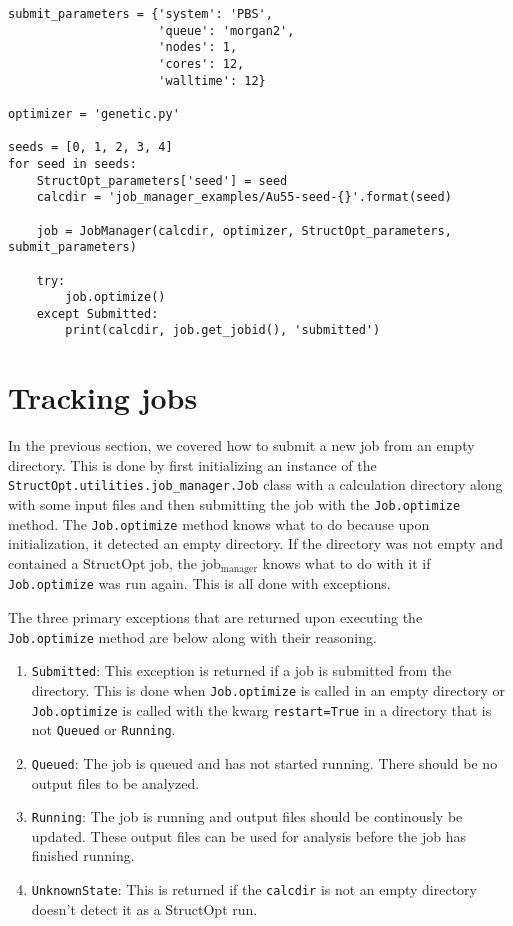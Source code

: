 \documentclass[11pt]{article}
\begin{document}
\begin{verbatim}
submit_parameters = {'system': 'PBS',
                     'queue': 'morgan2',
                     'nodes': 1,
                     'cores': 12,
                     'walltime': 12}

optimizer = 'genetic.py'

seeds = [0, 1, 2, 3, 4]
for seed in seeds:
    StructOpt_parameters['seed'] = seed
    calcdir = 'job_manager_examples/Au55-seed-{}'.format(seed)

    job = JobManager(calcdir, optimizer, StructOpt_parameters, submit_parameters)

    try:
        job.optimize()
    except Submitted:
        print(calcdir, job.get_jobid(), 'submitted')
\end{verbatim}

\section{Tracking jobs}
\label{sec-track}
In the previous section, we covered how to submit a new job from an empty directory. This is done by first initializing an instance of the \texttt{StructOpt.utilities.job\_manager.Job} class with a calculation directory along with some input files and then submitting the job with the \texttt{Job.optimize} method. The \texttt{Job.optimize} method knows what to do because upon initialization, it detected an empty directory. If the directory was not empty and contained a StructOpt job, the job\(_{\text{manager}}\) knows what to do with it if \texttt{Job.optimize} was run again. This is all done with exceptions.

The three primary exceptions that are returned upon executing the \texttt{Job.optimize} method are below along with their reasoning.

\begin{enumerate}
\item \texttt{Submitted}: This exception is returned if a job is submitted from the directory. This is done when \texttt{Job.optimize} is called in an empty directory or \texttt{Job.optimize} is called with the kwarg \texttt{restart=True} in a directory that is not \texttt{Queued} or \texttt{Running}.

\item \texttt{Queued}: The job is queued and has not started running. There should be no output files to be analyzed.

\item \texttt{Running}: The job is running and output files should be continously be updated. These output files can be used for analysis before the job has finished running.

\item \texttt{UnknownState}: This is returned if the \texttt{calcdir} is not an empty directory doesn't detect it as a StructOpt run.
\end{enumerate}
\end{document}
